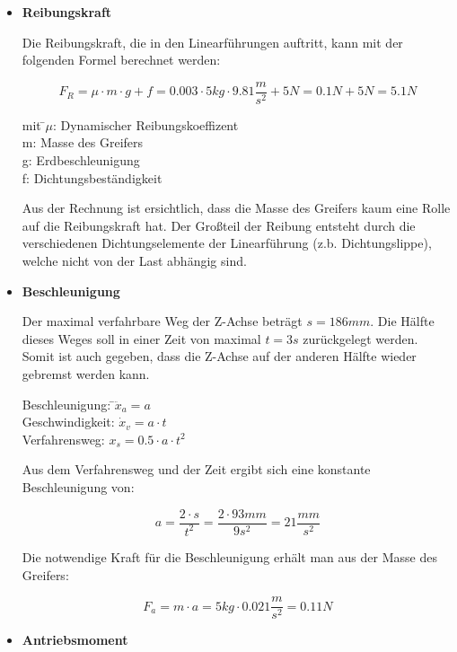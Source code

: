 \documentclass{scrartcl}
\begin{document}
\begin{itemize}

\item \textbf{Reibungskraft}

Die Reibungskraft, die in den Linearführungen auftritt, kann mit der folgenden Formel berechnet werden:

\[F_R=\mu\cdot m\cdot g+f=0.003 \cdot 5kg \cdot 9.81\dfrac{m}{s^2}+5N = 0.1N + 5N = 5.1N\]

\begin{tabbing}
mit \=$\mu$: Dynamischer Reibungskoeffizent\\
		\>m: Masse des Greifers\\
		\>g: Erdbeschleunigung\\
		\>f: Dichtungsbeständigkeit\\
\end{tabbing}

Aus der Rechnung ist ersichtlich, dass die Masse des Greifers kaum eine Rolle auf die Reibungskraft hat. 
Der Großteil der Reibung entsteht durch die verschiedenen Dichtungselemente der Linearführung (z.b. Dichtungslippe), 
welche nicht von der Last abhängig sind.


\item \textbf{Beschleunigung}
 
Der maximal verfahrbare Weg der Z-Achse beträgt $s=186mm$. Die Hälfte dieses Weges soll in einer Zeit von maximal $t=3s$ zurückgelegt werden. Somit ist auch gegeben, dass die Z-Achse auf der anderen Hälfte wieder gebremst werden kann. 


\begin{tabbing}
Beschleunigung: \qquad \=$\ddot{x}_a=a$\\
Geschwindigkeit: 							\>$\dot{x}_v=a\cdot t$\\
Verfahrensweg:												\>$x_s=0.5\cdot a\cdot t^2$\\
\end{tabbing}

Aus dem Verfahrensweg und der Zeit ergibt sich eine konstante Beschleunigung von:

\[a=\dfrac{2\cdot s}{t^2}=\dfrac{2\cdot 93mm}{9s^2}= 21\dfrac{mm}{s^2}\]

Die notwendige Kraft für die Beschleunigung erhält man aus der Masse des Greifers:

\[F_a=m\cdot a=5kg \cdot 0.021\dfrac{m}{s^2}=0.11N\]

\item \textbf{Antriebsmoment}



\end{itemize}
\end{document}
